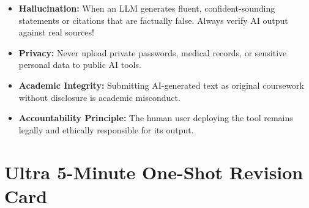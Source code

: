 \documentclass[a4paper,11pt]{article}
\begin{document}
\begin{examalert}
\begin{itemize}[leftmargin=5mm]
    \item \textbf{Hallucination:} When an LLM generates fluent, confident-sounding statements or citations that are factually false. Always verify AI output against real sources!
    \item \textbf{Privacy:} Never upload private passwords, medical records, or sensitive personal data to public AI tools.
    \item \textbf{Academic Integrity:} Submitting AI-generated text as original coursework without disclosure is academic misconduct.
    \item \textbf{Accountability Principle:} The human user deploying the tool remains legally and ethically responsible for its output.
\end{itemize}
\end{examalert}

\newpage

\section{Ultra 5-Minute One-Shot Revision Card}
\end{document}

